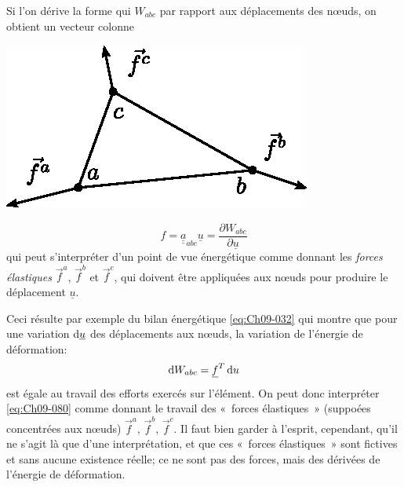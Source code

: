 Si l'on dérive la forme qui  $W_{abc}$ par rapport aux déplacements des nœuds, on obtient un vecteur colonne
\begin{multicols}{2}
    \begin{center}
        \includegraphics{../images/T1_Ch09-08}
    \end{center}
    \columnbreak
\begin{equation}
    f = \underline{\underline{a}}_{abc} \underline{u} = \frac{\partial W_{abc}}{\partial \underline{u}}
    \label{eq:Ch09-079}
\end{equation}
qui peut s'interpréter d'un point de vue énergétique comme donnant les \emph{forces élastiques} $\vec{f}^a$, $\vec{f}^b$ et $\vec{f}^c$, qui doivent être appliquées aux nœuds pour produire le déplacement $\underline{u}$.
\end{multicols}
Ceci résulte par exemple du bilan énergétique \eqref{eq:Ch09-032} qui montre que pour une variation $\mathop{\mathrm{{}d}}\mathopen{} \underline{u}$ des déplacements aux nœuds, la variation de l'énergie de déformation: 
\begin{equation}
    \mathop{\mathrm{{}d}}\mathopen{} W_{abc} = \underline{f}^T \mathop{\mathrm{{}d}}\mathopen{} u
    \label{eq:Ch09-080}
\end{equation}
est égale au travail des efforts exercés sur l'élément.
On peut donc interpréter \eqref{eq:Ch09-080} comme donnant le travail des «~forces élastiques~» (suppoées concentrées aux nœuds) $\vec{f}^a$, $\vec{f}^b$, $\vec{f}^c$.
Il faut bien garder à l'esprit, cependant, qu'il ne s'agit là que d'une interprétation, et que ces «~forces élastiques~» sont fictives et sans aucune existence réelle; ce ne sont pas 
des forces, mais des dérivées de l'énergie de déformation. 

